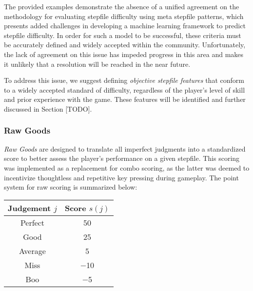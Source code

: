 \vspace{2mm}

The provided examples demonstrate the absence of a unified agreement on the methodology for evaluating stepfile difficulty using meta stepfile patterns, which presents added challenges in developing a machine learning framework to predict stepfile difficulty. In order for such a model to be successful, these criteria must be accurately defined and widely accepted within the community. Unfortunately, the lack of agreement on this issue has impeded progress in this area and makes it unlikely that a resolution will be reached in the near future.

\vspace{2mm}

To address this issue, we suggest defining \textit{objective stepfile features} that conform to a widely accepted standard of difficulty, regardless of the player's level of skill and prior experience with the game. These features will be identified and further discussed in Section [TODO].

\subsubsection{Raw Goods}

\textit{Raw Goods} are designed to translate all imperfect judgments into a standardized score to better assess the player's performance on a given stepfile. This scoring was implemented as a replacement for combo scoring, as the latter was deemed to incentivize thoughtless and repetitive key pressing during gameplay. The point system for raw scoring is summarized below:

\begin{center}
	\begin{tabular}{c@{\hskip 10mm}c}
		\hspace{5mm} \textbf{Judgement} $j$ \hspace{5mm} & \textbf{Score} $s(j)$ \\
		\hline
		
		Perfect                               & 50                    \\
		Good                                  & 25                    \\
		Average                               & 5                     \\
		Miss                                  & $-$10                 \\
		Boo                                   & $-$5                  \\
	\end{tabular}
\end{center}

